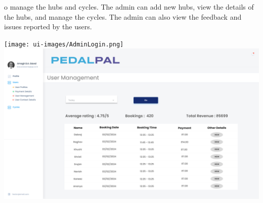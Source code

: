 o manage the hubs and cycles. The admin can add new hubs, view the details of the hubs, and manage the cycles. The admin can also view the feedback and issues reported by the users.
\begin{center}
    \texttt{[image: ui-images/AdminLogin.png]}
    \includegraphics[scale=0.08]{ui-images/AdminDashboard.png}
\end{center}

